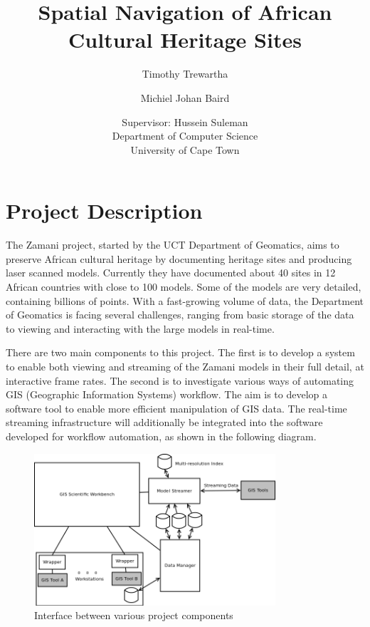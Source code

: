 \documentclass[12pt,a4paper]{article}
\begin{document}
\author{Timothy Trewartha \\
\and
Michiel Johan Baird \\
\and
Supervisor: Hussein Suleman \\
Department of Computer Science \\
University of Cape Town
 }
\title{Spatial Navigation of African Cultural Heritage Sites}
\maketitle

\section{Project Description}
The Zamani project, started by the UCT Department of Geomatics, aims to
preserve African cultural heritage by documenting heritage sites and producing
laser scanned models. Currently they have documented about 40 sites in 12 African
countries with close to 100 models. Some of the models are very detailed, containing
billions of points. With a fast-growing volume of data, the Department of Geomatics
is facing several challenges, ranging from basic storage of the data to viewing and
interacting with the large models in real-time.

There are two main components to this project. The first is to develop a system to
enable both viewing and streaming of the Zamani models in their full detail, at
interactive frame rates. The second is to investigate various ways of automating
GIS (Geographic Information Systems) workflow. The aim is to develop a software tool
to enable more efficient manipulation of GIS data. The real-time streaming
infrastructure will additionally be integrated into the software developed for
workflow automation, as shown in the following diagram.
\begin{figure}[h!]
\centering
    \includegraphics[width=0.8\textwidth]{projectDiagram.png}
    \caption{Interface between various project components}
\end{figure}
\end{document}
